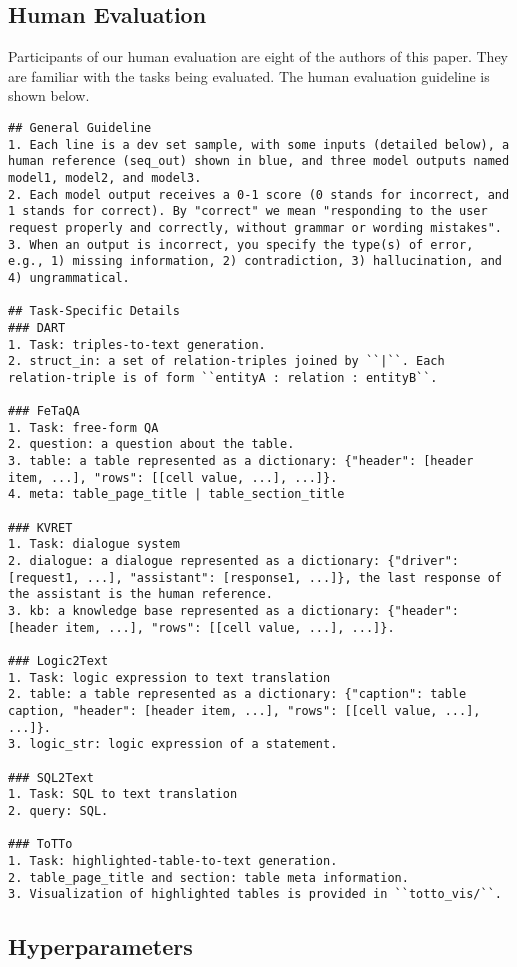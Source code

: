 \documentclass[11pt]{article}
\begin{document}
\subsection{Human Evaluation}
\label{subapp:human-evaluation}
Participants of our human evaluation are eight of the authors of this paper. They are familiar with the tasks being evaluated. The human evaluation guideline is shown below. 
\begin{lstlisting}
## General Guideline
1. Each line is a dev set sample, with some inputs (detailed below), a human reference (seq_out) shown in blue, and three model outputs named model1, model2, and model3.
2. Each model output receives a 0-1 score (0 stands for incorrect, and 1 stands for correct). By "correct" we mean "responding to the user request properly and correctly, without grammar or wording mistakes". 
3. When an output is incorrect, you specify the type(s) of error, e.g., 1) missing information, 2) contradiction, 3) hallucination, and 4) ungrammatical. 

## Task-Specific Details
### DART
1. Task: triples-to-text generation.
2. struct_in: a set of relation-triples joined by ``|``. Each relation-triple is of form ``entityA : relation : entityB``.

### FeTaQA
1. Task: free-form QA
2. question: a question about the table.
3. table: a table represented as a dictionary: {"header": [header item, ...], "rows": [[cell value, ...], ...]}.
4. meta: table_page_title | table_section_title

### KVRET
1. Task: dialogue system
2. dialogue: a dialogue represented as a dictionary: {"driver": [request1, ...], "assistant": [response1, ...]}, the last response of the assistant is the human reference. 
3. kb: a knowledge base represented as a dictionary: {"header": [header item, ...], "rows": [[cell value, ...], ...]}.

### Logic2Text
1. Task: logic expression to text translation
2. table: a table represented as a dictionary: {"caption": table caption, "header": [header item, ...], "rows": [[cell value, ...], ...]}.
3. logic_str: logic expression of a statement.

### SQL2Text
1. Task: SQL to text translation
2. query: SQL.

### ToTTo
1. Task: highlighted-table-to-text generation.
2. table_page_title and section: table meta information.
3. Visualization of highlighted tables is provided in ``totto_vis/``.
\end{lstlisting} 
\subsection{Hyperparameters}
\label{subapp:hyperparameters}
\end{document}
